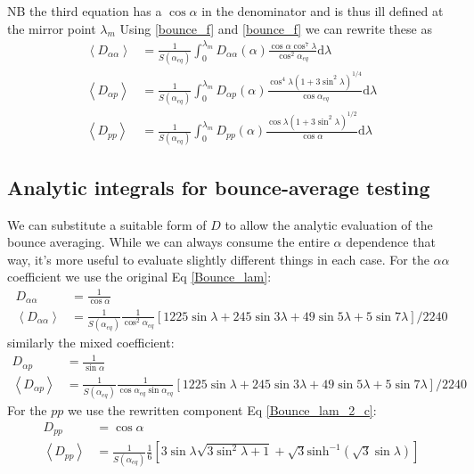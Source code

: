 \documentclass[]{article}
\begin{document}
NB the third equation has a $\cos\alpha$ in the denominator and is thus ill defined at the mirror point $\lambda_m$
Using \ref{bounce_f} and \ref{bounce_f} we can rewrite these as
\begin{align}\label{Bounce_lam_2}
\left< D_{\alpha \alpha}\right> &=\frac{1}{S(\alpha_{eq})} \int_0^{\lambda_m} D_{\alpha \alpha}(\alpha) \frac{\cos \alpha \cos^7\lambda}{\cos^2\alpha_{eq}} \mathrm{d}\lambda\\
\left< D_{\alpha p}\right> &=\frac{1}{S(\alpha_{eq})} \int_0^{\lambda_m} D_{\alpha p}(\alpha) \frac{\cos^4\lambda (1+3\sin^2\lambda)^{1/4}}{\cos\alpha_{eq}} \mathrm{d}\lambda\\
\left< D_{p p}\right> &=\frac{1}{S(\alpha_{eq})} \int_0^{\lambda_m} D_{p p}(\alpha) \frac{\cos\lambda (1+3\sin^2\lambda)^{1/2}}{\cos\alpha} \mathrm{d}\lambda\label{Bounce_lam_2_c}
\end{align}

\subsection{Analytic integrals for bounce-average testing}
We can substitute a suitable form of $D$ to allow the analytic evaluation of the bounce averaging. While we can always consume the entire $\alpha$ dependence that way, it's more useful to evaluate slightly different things in each case.
For the $\alpha \alpha$ coefficient we use the original Eq \ref{Bounce_lam}:
\begin{align}
D_{\alpha\alpha} &= \frac{1}{\cos \alpha}\\
\left< D_{\alpha \alpha}\right> &= \frac{1}{S(\alpha_{eq})} \frac{1}{\cos^2 \alpha_{eq}} \left[ 1225 \sin \lambda + 245 \sin 3\lambda + 49 \sin 5\lambda + 5 \sin 7\lambda\right]/2240
\end{align}
similarly the mixed coefficient:
\begin{align}
D_{\alpha p} &= \frac{1}{\sin \alpha}\\
\left< D_{\alpha p}\right> &= \frac{1}{S(\alpha_{eq})} \frac{1}{\cos\alpha_{eq}\sin\alpha_{eq}} \left[ 1225 \sin \lambda + 245 \sin 3\lambda + 49 \sin 5\lambda + 5 \sin 7\lambda\right]/2240
\end{align}
For the $p p$ we use the rewritten component Eq \ref{Bounce_lam_2_c}:
\begin{align}
D_{p p} & = \cos \alpha\\
\left< D_{p p}\right> &= \frac{1}{S(\alpha_{eq})} \frac{1}{6} \left[ 3 \sin \lambda \sqrt{3 \sin^2 \lambda + 1} + \sqrt{3} \mathrm{sinh}^{-1}(\sqrt{3}\sin\lambda)\right]
\end{align}
\end{document}
